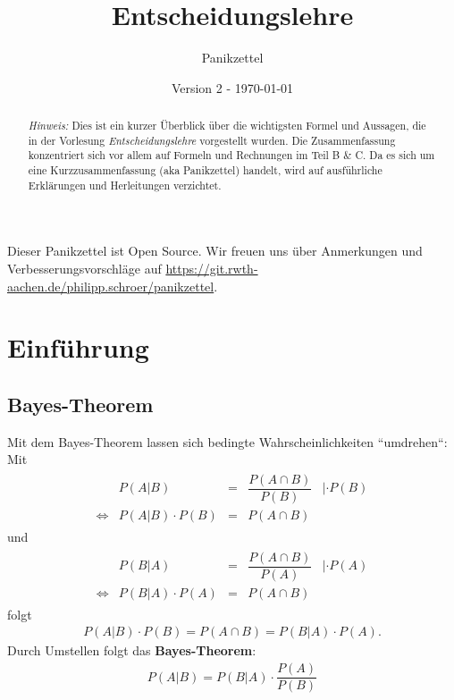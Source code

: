 \documentclass[12pt,a4paper]{scrartcl}
\author{}
\title{Entscheidungslehre}
\subtitle{Panikzettel}
\author{\authors}
\date{\small Version 2 - \today}
\begin{document}
\maketitle

\begin{abstract}
	\textit{Hinweis:} Dies ist ein kurzer Überblick über die wichtigsten Formel und Aussagen, die in der Vorlesung \textit{Entscheidungslehre} \cite{vonNitzsch:skript} vorgestellt wurden. Die Zusammenfassung konzentriert sich vor allem auf Formeln und Rechnungen im Teil B \& C. Da es sich um eine Kurzzusammenfassung (aka Panikzettel) handelt, wird auf ausführliche Erklärungen und Herleitungen verzichtet.
\end{abstract}
Dieser Panikzettel ist Open Source.
Wir freuen uns über Anmerkungen und Verbesserungsvorschläge auf \url{https://git.rwth-aachen.de/philipp.schroer/panikzettel}.

\vspace{1cm}
\setcounter{tocdepth}{1}
\tableofcontents

\newpage

\section{Einführung}

\subsection{Bayes-Theorem}
Mit dem Bayes-Theorem lassen sich bedingte Wahrscheinlichkeiten ``umdrehen``:\\
Mit
\begin{align*}
\begin{array}{rrcll}
& P(A | B) & =  & \dfrac{P(A \cap B)}{P(B)} & |\cdot P(B) \\
\Leftrightarrow & P (A|B) \cdot P(B) & = & P(A \cap B)
\end{array}
\end{align*}
und
\begin{align*}
\begin{array}{rrcll}
& P(B | A) & =  & \dfrac{P(A \cap B)}{P(A)} & |\cdot P(A) \\
\Leftrightarrow & P (B|A) \cdot P(A) & = & P(A \cap B)
\end{array}
\end{align*}
folgt
\begin{align*}
	P (A|B) \cdot P(B) = P(A \cap B) = P (B|A) \cdot P(A).
\end{align*}
Durch Umstellen folgt das \textbf{Bayes-Theorem}:
\begin{align*}
	P(A|B) = P(B|A) \cdot \dfrac{P(A)}{P(B)}
\end{align*}
\end{document}
